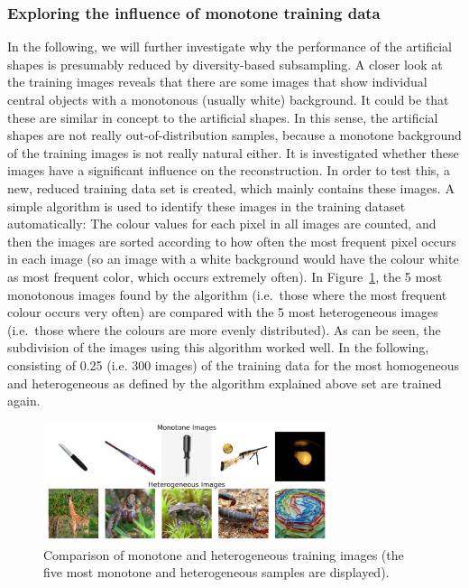 \subsubsection{Exploring the influence of monotone training data}
In the following, we will further investigate why the performance of the artificial shapes is presumably reduced by diversity-based subsampling. A closer look at the training images reveals that there are some images that show individual central objects with a monotonous (usually white) background. It could be that these are similar in concept to the artificial shapes. In this sense, the artificial shapes are not really out-of-distribution samples, because a monotone background of the training images is not really natural either. It is investigated whether these images have a significant influence on the reconstruction. In order to test this, a new, reduced training data set is created, which mainly contains these images. A simple algorithm is used to identify these images in the training dataset automatically: The colour values for each pixel in all images are counted, and then the images are sorted according to how often the most frequent pixel occurs in each image (so an image with a white background would have the colour white as most frequent color, which occurs extremely often). In Figure~\ref{fig:dropout_discussion_monohetero_qual}, the 5 most monotonous images found by the algorithm (i.e.\ those where the most frequent colour occurs very often) are compared with the 5 most heterogeneous images (i.e.\ those where the colours are more evenly distributed). As can be seen, the subdivision of the images using this algorithm worked well. In the following,  consisting of 0.25 (i.e. 300 images) of the training data for the most homogeneous and heterogeneous as defined by the algorithm explained above set are trained again.


\begin{figure}[ht]
  \centering
  \includegraphics[width=0.75\textwidth]{plots/dropout_discussion_monohetero_qual.jpeg}
  \caption[Monotone and heterogeneous samples in the training dataset]{Comparison of monotone and heterogeneous training images (the five most monotone and heterogeneous samples are displayed).}\label{fig:dropout_discussion_monohetero_qual}
\end{figure}

